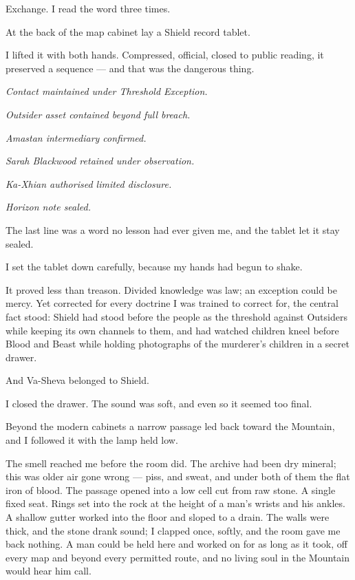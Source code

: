 Exchange. I read the word three times.\par

At the back of the map cabinet lay a Shield record tablet.\par

I lifted it with both hands. Compressed, official, closed to public reading, it preserved a sequence --- and that was the dangerous thing.\par

\textit{Contact maintained under Threshold Exception.}\par

\textit{Outsider asset contained beyond full breach.}\par

\textit{Amastan intermediary confirmed.}\par

\textit{Sarah Blackwood retained under observation.}\par

\textit{Ka-Xhian authorised limited disclosure.}\par

\textit{Horizon note sealed.}\par

The last line was a word no lesson had ever given me, and the tablet let it stay sealed.\par


I set the tablet down carefully, because my hands had begun to shake.

It proved less than treason. Divided knowledge was law; an exception could be mercy. Yet corrected for every doctrine I was trained to correct for, the central fact stood: Shield had stood before the people as the threshold against Outsiders while keeping its own channels to them, and had watched children kneel before Blood and Beast while holding photographs of the murderer's children in a secret drawer.\par

And Va-Sheva belonged to Shield.

I closed the drawer. The sound was soft, and even so it seemed too final.\par

Beyond the modern cabinets a narrow passage led back toward the Mountain, and I followed it with the lamp held low.\par

The smell reached me before the room did. The archive had been dry mineral; this was older air gone wrong --- piss, and sweat, and under both of them the flat iron of blood. The passage opened into a low cell cut from raw stone. A single fixed seat. Rings set into the rock at the height of a man's wrists and his ankles. A shallow gutter worked into the floor and sloped to a drain. The walls were thick, and the stone drank sound; I clapped once, softly, and the room gave me back nothing. A man could be held here and worked on for as long as it took, off every map and beyond every permitted route, and no living soul in the Mountain would hear him call.\par

